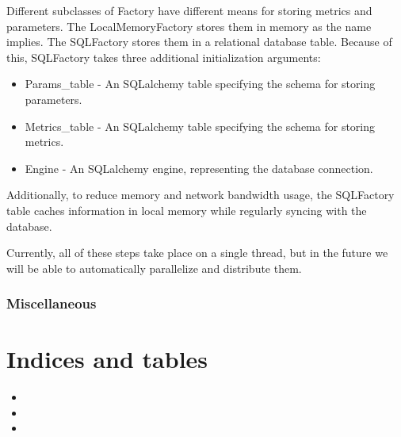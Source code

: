 \documentclass[letterpaper,10pt,english]{sphinxmanual}
\begin{document}
Different subclasses of Factory have different means for storing metrics and parameters. The LocalMemoryFactory stores them in memory as the
name implies. The SQLFactory stores them in a relational database table. Because of this, SQLFactory takes three additional initialization arguments:
\begin{itemize}
\item {} 
Params\_table - An SQLalchemy table specifying the schema for storing parameters.

\item {} 
Metrics\_table - An SQLalchemy table specifying the schema for storing metrics.

\item {} 
Engine - An SQLalchemy engine, representing the database connection.

\end{itemize}

Additionally, to reduce memory and network bandwidth usage, the SQLFactory table caches information in local memory while regularly syncing
with the database.

Currently, all of these steps take place on a single thread, but in the future we will be able to automatically parallelize and distribute them.


\subsection{Miscellaneous}
\label{\detokenize{Fireworks:miscellaneous}}

\chapter{Indices and tables}
\label{\detokenize{index:indices-and-tables}}\begin{itemize}
\item {} 

\item {} 

\item {} 

\end{itemize}



\renewcommand{\indexname}{Index}
\printindex
\end{document}
